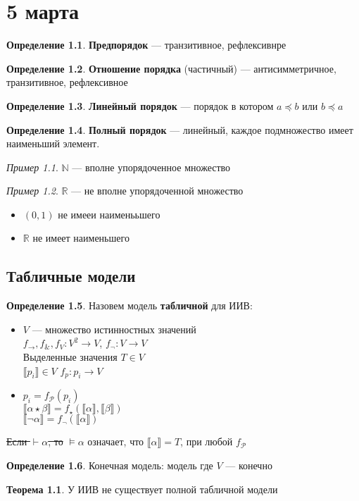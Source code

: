 \documentclass[oneside]{book}
\newcommand{\R}{\mathbb{R}}
\newcommand{\N}{\mathbb{N}}
\newcommand{\A}{\mathfrak{A}}
\newcommand{\B}{\mathfrak{B}}
\theoremstyle{plain}
\theoremstyle{remark}
\newtheorem*{examp}{Пример}
\theoremstyle{definition}
\newtheorem{theorem}{Теорема}[section]
\newtheorem*{definition}{Определение}
\begin{document}
\chapter{5 марта}
\label{sec:org45452fc}
\renewcommand{\P}{\mathcal{P}}
\newcommand{\A}{\mathcal{A}}
\newcommand{\L}{\mathcal{L}}
\newcommand{\B}{\mathcal{B}}


\begin{definition}
\textbf{Предпорядок} --- транзитивное, рефлексивнре
\end{definition}
\begin{definition}
\textbf{Отношение порядка} (частичный) --- антисимметричное, транзитивное, рефлексивное
\end{definition}
\begin{definition}
\textbf{Линейный порядок} --- порядок в котором \(a \preceq b\) или \(b \preceq a\)
\end{definition}
\begin{definition}
\textbf{Полный порядок} --- линейный, каждое подмножество имеет наименьший элемент. 
\end{definition}
\begin{examp}
\(\N\) --- вполне упорядоченное множество
\end{examp}
\begin{examp}
\(\R\) --- не вполне упорядоченной множество
\begin{itemize}
\item \((0, 1)\) не имееи наименььшего
\item \(\R\) не имеет наименьшего
\end{itemize}
\end{examp}
\section{Табличные модели}
\label{sec:org8400a9b}
\begin{definition}
Назовем модель \textbf{табличной} для ИИВ:
\begin{itemize}
\item \(V\) --- множество истинностных значений \\
\(f_\to,f_\&, f_V: V^2 \to V\), \(f_\neg: V \to V\) \\
Выделенные значения \(T \in V\) \\
\(\llbracket p_i \rrbracket \in V\) \(f_p : p_i \to V\)
\item \(p_i = f_\P(p_i)\) \\
\(\llbracket\alpha \star \beta\rrbracket = f_\star(\llbracket\alpha\rrbracket, \llbracket\beta\rrbracket)\) \\
\(\llbracket\neg \alpha\rrbracket = f_\neg(\llbracket\alpha\rrbracket)\)
\end{itemize}
\sout{Если \(\vdash \alpha\), то} \(\vDash \alpha\) означает, что \(\llbracket\alpha\rrbracket = T\), при любой \(f_\P\)
\label{org34ee35f}
\end{definition}
\begin{definition}
Конечная модель: модель где \(V\) --- конечно
\label{orgde6197e}
\end{definition}
\begin{theorem}
У ИИВ не существует полной табличной модели
\label{org4554d15}
\end{theorem}
\end{document}

